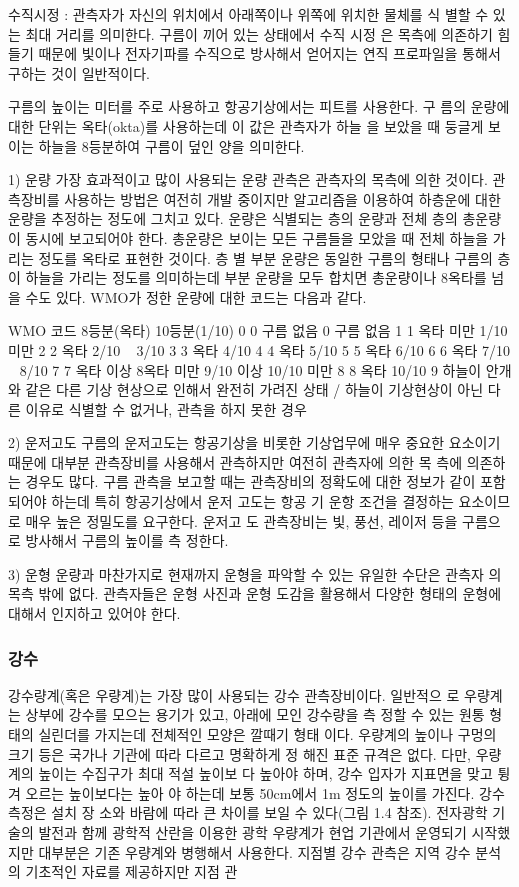 \begin{itemize}
수직시정 : 관측자가 자신의 위치에서 아래쪽이나 위쪽에 위치한 물체를 식
별할 수 있는 최대 거리를 의미한다. 구름이 끼어 있는 상태에서 수직 시정
은 목측에 의존하기 힘들기 때문에 빛이나 전자기파를 수직으로 방사해서
얻어지는 연직 프로파일을 통해서 구하는 것이 일반적이다.

구름의 높이는 미터를 주로 사용하고 항공기상에서는 피트를 사용한다. 구
름의 운량에 대한 단위는 옥타(okta)를 사용하는데 이 값은 관측자가 하늘
을 보았을 때 둥글게 보이는 하늘을 8등분하여 구름이 덮인 양을 의미한다.



1) 운량
가장 효과적이고 많이 사용되는 운량 관측은 관측자의 목측에 의한 것이다.
관측장비를 사용하는 방법은 여전히 개발 중이지만 알고리즘을 이용하여
하층운에 대한 운량을 추정하는 정도에 그치고 있다. 운량은 식별되는 층의
운량과 전체 층의 총운량이 동시에 보고되어야 한다. 총운량은 보이는 모든
구름들을 모았을 때 전체 하늘을 가리는 정도를 옥타로 표현한 것이다. 층
별 부분 운량은 동일한 구름의 형태나 구름의 층이 하늘을 가리는 정도를
의미하는데 부분 운량을 모두 합치면 총운량이나 8옥타를 넘을 수도 있다.
WMO가 정한 운량에 대한 코드는 다음과 같다.

WMO 코드 8등분(옥타) 10등분(1/10)
0 0 구름 없음 0 구름 없음
1 1 옥타 미만 1/10 미만
2 2 옥타 2/10 ~ 3/10
3 3 옥타 4/10
4 4 옥타 5/10
5 5 옥타 6/10
6 6 옥타 7/10 ~ 8/10
7 7 옥타 이상 8옥타 미만 9/10 이상 10/10 미만
8 8 옥타 10/10
9 하늘이 안개와 같은 다른 기상 현상으로 인해서 완전히 가려진 상태
/ 하늘이 기상현상이 아닌 다른 이유로 식별할 수 없거나, 관측을 하지 못한 경우

2) 운저고도
구름의 운저고도는 항공기상을 비롯한 기상업무에 매우 중요한 요소이기
때문에 대부분 관측장비를 사용해서 관측하지만 여전히 관측자에 의한 목
측에 의존하는 경우도 많다. 구름 관측을 보고할 때는 관측장비의 정확도에
대한 정보가 같이 포함되어야 하는데 특히 항공기상에서 운저 고도는 항공
기 운항 조건을 결정하는 요소이므로 매우 높은 정밀도를 요구한다. 운저고
도 관측장비는 빛, 풍선, 레이저 등을 구름으로 방사해서 구름의 높이를 측
정한다.


3) 운형
운량과 마찬가지로 현재까지 운형을 파악할 수 있는 유일한 수단은 관측자
의 목측 밖에 없다. 관측자들은 운형 사진과 운형 도감을 활용해서 다양한
형태의 운형에 대해서 인지하고 있어야 한다.

\subsubsection{강수}

강수량계(혹은 우량계)는 가장 많이 사용되는 강수 관측장비이다. 일반적으
로 우량계는 상부에 강수를 모으는 용기가 있고, 아래에 모인 강수량을 측
정할 수 있는 원통 형태의 실린더를 가지는데 전체적인 모양은 깔때기 형태
이다.
우량계의 높이나 구멍의 크기 등은 국가나 기관에 따라 다르고 명확하게 정
해진 표준 규격은 없다. 다만, 우량계의 높이는 수집구가 최대 적설 높이보
다 높아야 하며, 강수 입자가 지표면을 맞고 튕겨 오르는 높이보다는 높아
야 하는데 보통 50cm에서 1m 정도의 높이를 가진다. 강수 측정은 설치 장
소와 바람에 따라 큰 차이를 보일 수 있다(그림 1.4 참조). 전자광학 기술의
발전과 함께 광학적 산란을 이용한 광학 우량계가 현업 기관에서 운영되기
시작했지만 대부분은 기존 우량계와 병행해서 사용한다.
지점별 강수 관측은 지역 강수 분석의 기초적인 자료를 제공하지만 지점 관


\end{itemize}
